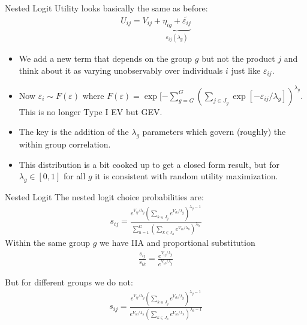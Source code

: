 \documentclass[xcolor=pdftex,dvipsnames,table,mathserif,aspectratio=169]{beamer}
\begin{document}
\begin{frame}{Nested Logit}
Utility looks basically the same as before:
\begin{eqnarray*}
U_{ij} = V_{ij} + \underbrace{\eta_{ig} + \widetilde{\varepsilon_{ij}}}_{\varepsilon_{ij}(\lambda_g)}
\end{eqnarray*}
\begin{itemize}
\item We add a new term that depends on the group $g$ but not the product $j$ and think about it as varying unobservably over individuals $i$ just like $\varepsilon_{ij}$.
\item Now $\varepsilon_i \sim F(\varepsilon)$ where $F(\varepsilon) = \exp[-\sum_{g=G}^G \left(\sum_{j \in J_g} \exp[-\varepsilon_{ij}/\lambda_g]\right)^{\lambda_g}$. This is no longer Type I EV but GEV.
\item The key is the addition of the $\lambda_g$ parameters which govern (roughly) the within group correlation.
\item This distribution is a bit cooked up to get a closed form result, but for $\lambda_g \in [0,1]$ for all $g$ it is consistent with random utility maximization.
\end{itemize}
\end{frame}

\begin{frame}{Nested Logit}
\small
The nested logit choice probabilities are:
\begin{eqnarray*}
s_{ij} = \frac{ e^{V_{ij}/\lambda_g} \left(\sum_{k \in J_g} e^{V_{ik}/\lambda_g} \right)^{\lambda_g -1}}{\sum_{h=1}^G \left(\sum_{k \in J_h} e^{V_{ik}/\lambda_h} \right)^{\lambda_h}}
\end{eqnarray*}
Within the same group $g$ we have IIA and proportional substitution 
\begin{eqnarray*}
\frac{s_{ij}}{s_{ik}} = \frac{ e^{V_{ij}/\lambda_g}}{ e^{V_{ik}/\lambda_g}}
\end{eqnarray*}

But for different groups we do not:
\begin{eqnarray*}
s_{ij} = \frac{ e^{V_{ij}/\lambda_g} \left(\sum_{k \in J_g} e^{V_{ik}/\lambda_g} \right)^{\lambda_g -1}}{ e^{V_{ik}/\lambda_h} \left(\sum_{k \in J_h} e^{V_{ik}/\lambda_h} \right)^{\lambda_h -1}}
\end{eqnarray*}
\end{frame}
\end{document}
